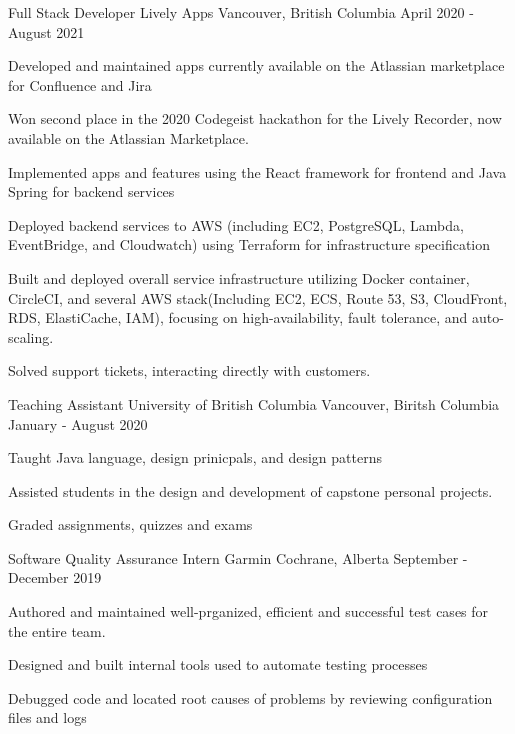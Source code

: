 \begin{cventries}
  \cventry
    {Full Stack Developer} %
    {Lively Apps} %
    {Vancouver, British Columbia} %
    {April 2020 - August 2021} %
    {
      \begin{cvitems} %
        \item {Developed and maintained apps currently available on the Atlassian marketplace for Confluence and Jira}
        \item {Won second place in the 2020 Codegeist hackathon for the Lively Recorder, now available on the Atlassian Marketplace.}
        \item {Implemented apps and features using the React framework for frontend and Java Spring for backend services}
        \item {Deployed backend services to AWS (including EC2, PostgreSQL, Lambda, EventBridge, and Cloudwatch) using Terraform for infrastructure specification}
        \item {Built and deployed overall service infrastructure utilizing Docker container, CircleCI, and several AWS stack(Including EC2, ECS, Route 53, S3, CloudFront, RDS, ElastiCache, IAM), focusing on high-availability, fault tolerance, and auto-scaling.}
        \item {Solved support tickets, interacting directly with customers.}
      \end{cvitems}
    }


  \cventry
    {Teaching Assistant} %
    {University of British Columbia} %
    {Vancouver, Biritsh Columbia} %
    {January - August 2020} %
    {
      \begin{cvitems} %
        \item {Taught Java language, design prinicpals, and design patterns}
        \item {Assisted students in the design and development of capstone personal projects.}
        \item {Graded assignments, quizzes and exams}
      \end{cvitems}
    }

  \cventry
    {Software Quality Assurance Intern} %
    {Garmin} %
    {Cochrane, Alberta} %
    {September - December 2019} %
    {
      \begin{cvitems} %
        \item {Authored and maintained well-prganized, efficient and successful test cases for the entire team.}
        \item {Designed and built internal tools used to automate testing processes}
        \item {Debugged code and located root causes of problems by reviewing configuration files and logs}
      \end{cvitems}
    }

\end{cventries}
